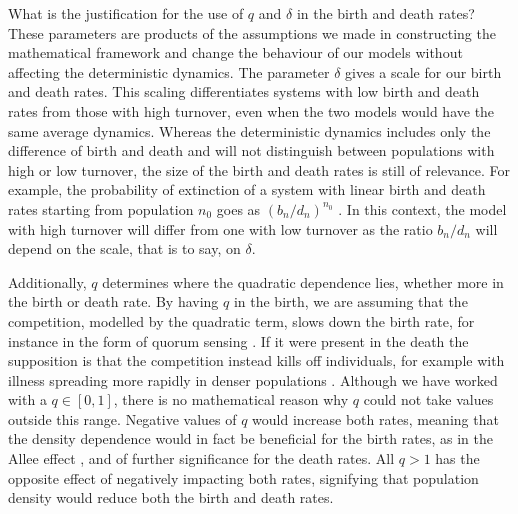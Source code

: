 What is the justification for the use of $q$ and $\delta$ in the birth and death rates? 
These parameters are products of the assumptions we made in constructing the mathematical framework and change the behaviour of our models without affecting the deterministic dynamics.
The parameter $\delta$ gives a scale for our birth and death rates.
This scaling differentiates systems with low birth and death rates from those with high turnover, even when the two models would have the same average dynamics. 
Whereas the deterministic dynamics includes only the difference of birth and death and will not distinguish between populations with high or low turnover, the size of the birth and death rates is still of relevance. 
For example, the probability of extinction of a system with linear birth and death rates starting from population $n_0$ goes as $(b_n/d_n)^{n_0}$ \cite{Nisbet1982}.
In this context, the model with high turnover will differ from one with low turnover as the ratio $b_n/d_n$ will depend on the scale, that is to say, on $\delta$. 

Additionally, $q$ determines where the quadratic dependence lies, whether more in the birth or death rate. 
By having $q$ in the birth, we are assuming that the competition, modelled by the quadratic term, slows down the birth rate, for instance in the form of quorum sensing \cite{Nadell2008}. %
If it were present in the death the supposition is that the competition instead kills off individuals, for example with illness spreading more rapidly in denser populations \cite{}.
Although we have worked with a $q \in [0,1]$, there is no mathematical reason why $q$ could not take values outside this range. 
Negative values of $q$ would increase both rates, meaning that the density dependence would in fact be beneficial for the birth rates, as in the Allee effect \cite{}, and of further significance for the death rates. 
All $q>1$ has the opposite effect of negatively impacting both rates, signifying that population density would reduce both the birth and death rates. %

